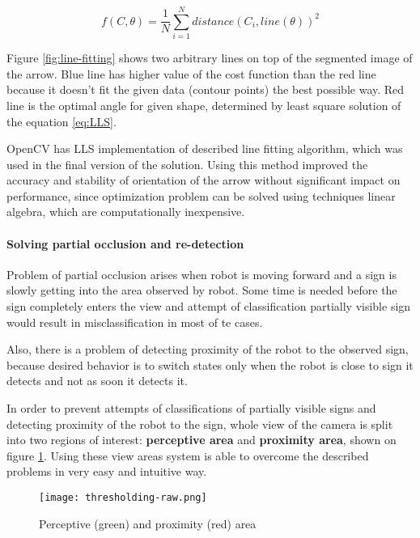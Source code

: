 \begin{equation}
f(C,\theta)=
\frac{1}{N}
\sum_{i=1}^{N}distance(C_i, line(\theta))^2
\label{eq:LLS}
\end{equation}

Figure \ref{fig:line-fitting} shows two arbitrary lines on top of the segmented image of the arrow. Blue line has higher value of the cost function than the red line because it doesn't fit the given data (contour points) the best possible way. Red line is the optimal angle for given shape, determined by least square solution of the equation \ref{eq:LLS}.

OpenCV has LLS implementation of described line fitting algorithm, which was used in the final version of the solution. Using this method improved the accuracy and stability of orientation of the arrow without significant impact on performance, since optimization problem can be solved using techniques linear algebra, which are computationally inexpensive.

\paragraph{Solving partial occlusion and re-detection}

Problem of partial occlusion arises when robot is moving forward and a sign is slowly getting into the area observed by robot. Some time is needed before the sign completely enters the view and attempt of classification partially visible sign would result in misclassification in most of te cases.

Also, there is a problem of detecting proximity of the robot to the observed sign, because desired behavior is to switch states only when the robot is close to sign it detects and not as soon it detects it.

In order to prevent attempts of classifications of partially visible signs and detecting proximity of the robot to the sign, whole view of the camera is split into two regions of interest: \textbf{perceptive area} and \textbf{proximity area}, shown on figure \ref{fig:camera-view-areas}. Using these view areas system is able to overcome the described problems in very easy and intuitive way.

\begin{figure}[th!]
	\centering
		\texttt{[image: thresholding-raw.png]}
	\caption{Perceptive (green) and proximity (red) area}
	\label{fig:camera-view-areas}
\end{figure}

